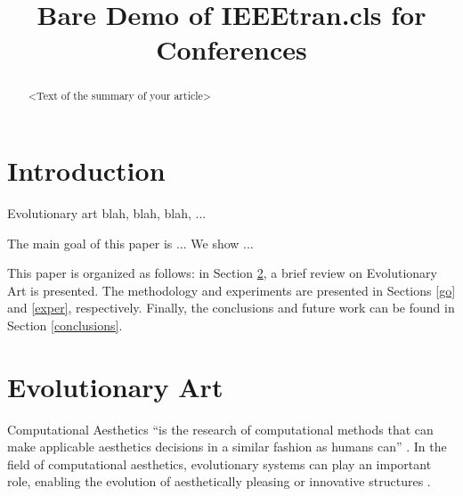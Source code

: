 \documentclass[conference]{IEEEtran}
\begin{document}
\title{Bare Demo of IEEEtran.cls for Conferences}
\author{
\and
{}
\and
{}
}

\maketitle

\begin{abstract}
<Text of the summary of your article>
\end{abstract}

\section{Introduction}\label{intro}
Evolutionary art blah, blah, blah, ...

The main goal of this paper is ... We show ...

This paper is organized as follows: in Section \ref{evo_art}, a brief review on Evolutionary Art is presented. The methodology and experiments are presented in Sections \ref{go} and \ref{exper}, respectively. Finally, the conclusions and future work can be found in Section \ref{conclusions}.

\section{Evolutionary Art}\label{evo_art}

Computational Aesthetics ``is the research of computational methods that can make applicable aesthetics decisions in a similar fashion as humans can'' \cite{COMPAESTH05:13-18:2005}. In the field of computational aesthetics, evolutionary systems can play an important role, enabling the evolution of aesthetically pleasing or innovative structures \cite{dipaola2009incorporating}.
\end{document}
